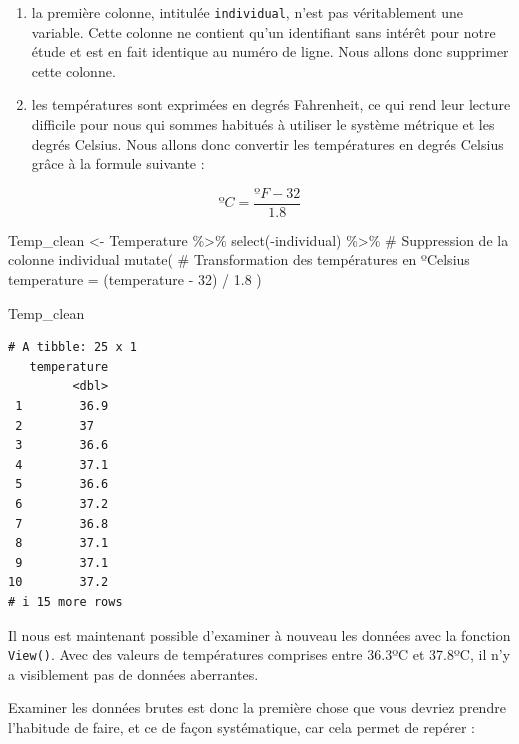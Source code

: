 \documentclass[
  a4paper,
  DIV=11,
  numbers=noendperiod,
  oneside]{scrreprt}
\newenvironment{Shaded}{}{}
\newcommand{\AttributeTok}[1]{\textcolor[rgb]{0.84,0.23,0.29}{#1}}
\newcommand{\CommentTok}[1]{\textcolor[rgb]{0.42,0.45,0.49}{#1}}
\newcommand{\DecValTok}[1]{\textcolor[rgb]{0.00,0.36,0.77}{#1}}
\newcommand{\FloatTok}[1]{\textcolor[rgb]{0.00,0.36,0.77}{#1}}
\newcommand{\FunctionTok}[1]{\textcolor[rgb]{0.44,0.26,0.76}{#1}}
\newcommand{\NormalTok}[1]{\textcolor[rgb]{0.14,0.16,0.18}{#1}}
\newcommand{\OtherTok}[1]{\textcolor[rgb]{0.44,0.26,0.76}{#1}}
\newcommand{\SpecialCharTok}[1]{\textcolor[rgb]{0.00,0.36,0.77}{#1}}
\providecommand{\tightlist}{%
  \setlength{\itemsep}{0pt}\setlength{\parskip}{0pt}}\usepackage{longtable,booktabs,array}
\begin{document}
\begin{enumerate}
\def\labelenumi{\arabic{enumi}.}
\tightlist
\item
  la première colonne, intitulée \texttt{individual}, n'est pas
  véritablement une variable. Cette colonne ne contient qu'un
  identifiant sans intérêt pour notre étude et est en fait identique au
  numéro de ligne. Nous allons donc supprimer cette colonne.
\item
  les températures sont exprimées en degrés Fahrenheit, ce qui rend leur
  lecture difficile pour nous qui sommes habitués à utiliser le système
  métrique et les degrés Celsius. Nous allons donc convertir les
  températures en degrés Celsius grâce à la formule suivante :
\end{enumerate}

\[ºC = \frac{ºF - 32}{1.8}\]

\begin{Shaded}
\begin{Highlighting}[]
\NormalTok{Temp\_clean }\OtherTok{\textless{}{-}}\NormalTok{ Temperature }\SpecialCharTok{\%\textgreater{}\%}
  \FunctionTok{select}\NormalTok{(}\SpecialCharTok{{-}}\NormalTok{individual) }\SpecialCharTok{\%\textgreater{}\%}      \CommentTok{\# Suppression de la colonne \textasciigrave{}individual\textasciigrave{}}
  \FunctionTok{mutate}\NormalTok{(                      }\CommentTok{\# Transformation des températures en ºCelsius}
    \AttributeTok{temperature =}\NormalTok{ (temperature }\SpecialCharTok{{-}} \DecValTok{32}\NormalTok{) }\SpecialCharTok{/} \FloatTok{1.8}
\NormalTok{    )}

\NormalTok{Temp\_clean}
\end{Highlighting}
\end{Shaded}

\begin{verbatim}
# A tibble: 25 x 1
   temperature
         <dbl>
 1        36.9
 2        37  
 3        36.6
 4        37.1
 5        36.6
 6        37.2
 7        36.8
 8        37.1
 9        37.1
10        37.2
# i 15 more rows
\end{verbatim}

Il nous est maintenant possible d'examiner à nouveau les données avec la
fonction \texttt{View()}. Avec des valeurs de températures comprises
entre 36.3ºC et 37.8ºC, il n'y a visiblement pas de données aberrantes.

Examiner les données brutes est donc la première chose que vous devriez
prendre l'habitude de faire, et ce de façon systématique, car cela
permet de repérer :
\end{document}
